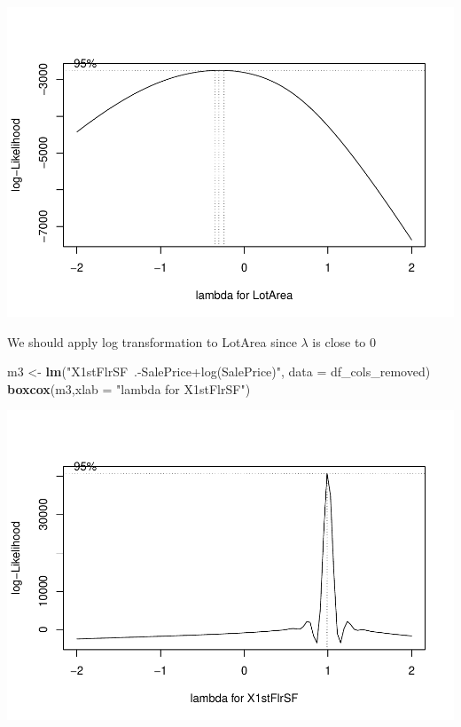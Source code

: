 \documentclass[
]{article}
\newenvironment{Shaded}{\begin{snugshade}}{\end{snugshade}}
\newcommand{\DataTypeTok}[1]{\textcolor[rgb]{0.13,0.29,0.53}{#1}}
\newcommand{\KeywordTok}[1]{\textcolor[rgb]{0.13,0.29,0.53}{\textbf{#1}}}
\newcommand{\NormalTok}[1]{#1}
\newcommand{\StringTok}[1]{\textcolor[rgb]{0.31,0.60,0.02}{#1}}
\begin{document}
\includegraphics{Project_files/figure-latex/unnamed-chunk-15-1.pdf}

We should apply log transformation to LotArea since \(\lambda\) is close to 0

\begin{Shaded}
\begin{Highlighting}[]
\NormalTok{m3 <-}\StringTok{ }\KeywordTok{lm}\NormalTok{(}\StringTok{"X1stFlrSF~.-SalePrice+log(SalePrice)"}\NormalTok{, }\DataTypeTok{data =}\NormalTok{ df_cols_removed)}
\KeywordTok{boxcox}\NormalTok{(m3,}\DataTypeTok{xlab =} \StringTok{"lambda for X1stFlrSF"}\NormalTok{)}
\end{Highlighting}
\end{Shaded}

\includegraphics{Project_files/figure-latex/unnamed-chunk-16-1.pdf}
\end{document}
